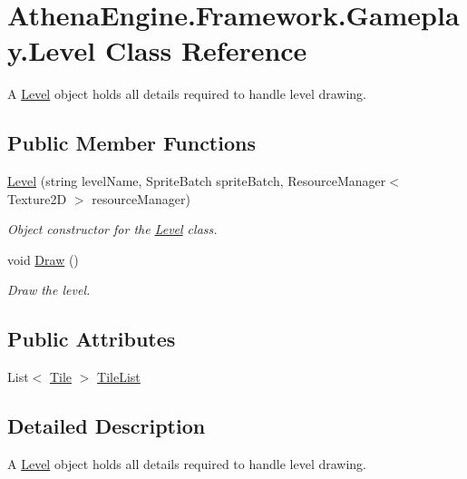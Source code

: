 \hypertarget{class_athena_engine_1_1_framework_1_1_gameplay_1_1_level}{\section{Athena\-Engine.\-Framework.\-Gameplay.\-Level Class Reference}
\label{class_athena_engine_1_1_framework_1_1_gameplay_1_1_level}
}


A \hyperlink{class_athena_engine_1_1_framework_1_1_gameplay_1_1_level}{Level} object holds all details required to handle level drawing.  


\subsection*{Public Member Functions}
\begin{DoxyCompactItemize}
\item 
\hyperlink{class_athena_engine_1_1_framework_1_1_gameplay_1_1_level_acf8df46b971e6653484145698b03670d}{Level} (string level\-Name, Sprite\-Batch sprite\-Batch, Resource\-Manager$<$ Texture2\-D $>$ resource\-Manager)
\begin{DoxyCompactList}\small\item\em Object constructor for the \hyperlink{class_athena_engine_1_1_framework_1_1_gameplay_1_1_level}{Level} class. \end{DoxyCompactList}\item 
void \hyperlink{class_athena_engine_1_1_framework_1_1_gameplay_1_1_level_a22f3be2d849544ff8220565b9a95b05d}{Draw} ()
\begin{DoxyCompactList}\small\item\em Draw the level. \end{DoxyCompactList}\end{DoxyCompactItemize}
\subsection*{Public Attributes}
\begin{DoxyCompactItemize}
\item 
List$<$ \hyperlink{class_athena_engine_1_1_framework_1_1_gameplay_1_1_tile}{Tile} $>$ \hyperlink{class_athena_engine_1_1_framework_1_1_gameplay_1_1_level_a6773a6b354bc2037f1a9c27c2035e7de}{Tile\-List}
\end{DoxyCompactItemize}


\subsection{Detailed Description}
A \hyperlink{class_athena_engine_1_1_framework_1_1_gameplay_1_1_level}{Level} object holds all details required to handle level drawing. 



